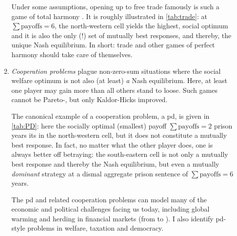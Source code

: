 \begin{enumerate}
\begin{enumerate}
		Under some assumptions, opening up to free trade famously is such a game of total harmony \citep{Ricardo1817}.
		It is roughly illustrated in \autoref{tab:trade}:
		at $\sum{\text{payoffs}}=6$, the north-western cell yields the highest, social optimum and it is also the only (!) set of mutually best responses, and thereby, the unique Nash equilibrium.
		In short:
		trade and other games of perfect harmony should take care of themselves.

		\item
		\emph{Cooperation problems} plague non-zero-sum situations where the social welfare optimum is not also (at least) \emph{a} Nash equilibrium.
		Here, at least one player may gain more than all others stand to loose.
		Such games cannot be Pareto-, but only Kaldor-Hicks improved.

		The canonical example of a cooperation problem, a \gls{pd}, is given in \autoref{tab:PD}:
		here the socially optimal (smallest) payoff $\sum{\text{payoffs}}=2$ prison years its in the north-western cell, but it does not constitute a mutually best response.
		In fact, no matter what the other player does, one is always better off betraying:
		the south-eastern cell is not only a mutually best response and thereby the Nash equilibrium, but even a mutually \emph{dominant} strategy at a dismal aggregate prison sentence of $\sum{\text{payoffs}}=6$ years.

		The \gls{pd} and related cooperation problems can model many of the economic and political challenges facing us today, including global warming \citep[for example,][]{Stern-2006-aa} and herding in financial markets (from \citealt {Keynes1936} to \citealt{Banerjee-1992-aa}).
		I also identify \gls{pd}-style problems in welfare, taxation and democracy.
	\end{enumerate}
\end{enumerate}

